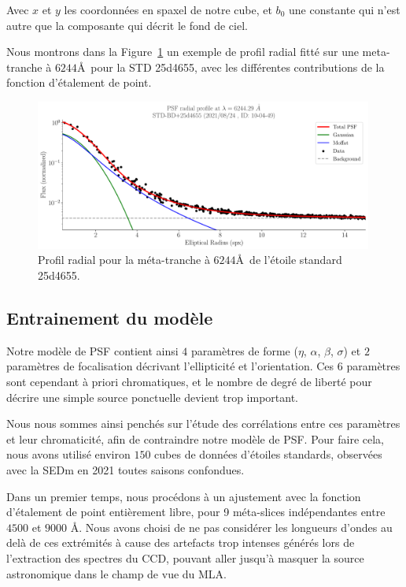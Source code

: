 \documentclass[../main/main.tex]{subfiles}
\begin{document}
Avec $x$ et $y$ les coordonnées en spaxel de notre cube, et $b_{0}$ une
constante qui n'est autre que la composante qui décrit le fond de ciel.

Nous montrons dans la Figure~\ref{fig:radialprofile} un exemple de
profil radial fitté sur une meta-tranche à $6244$\AA\ pour la STD
25d4655, avec les différentes contributions de la fonction
d'étalement de point.
\begin{figure}[ht]
  \centering
  \includegraphics[width=0.99\textwidth]{../figures/06_irf/psfprofile.pdf}
  \caption[Exemple de profil radial d'un étoile standard]{Profil radial
    pour la méta-tranche à $6244$\AA\ de l'étoile standard 25d4655.}
  \label{fig:radialprofile}
\end{figure}

\subsection{Entrainement du modèle}\label{ssec:psftraining}

Notre modèle de PSF contient ainsi $4$ paramètres de forme ($\eta$,
$\alpha$, $\beta$, $\sigma$) et $2$ paramètres de focalisation décrivant
l'ellipticité et l'orientation. Ces $6$ paramètres sont cependant à
priori chromatiques, et le nombre de degré de liberté pour décrire une
simple source ponctuelle devient trop important.

Nous nous sommes ainsi penchés sur l'étude des corrélations entre ces
paramètres et leur chromaticité, afin de contraindre notre modèle de
PSF. Pour faire cela, nous avons utilisé environ $150$ cubes de
données d'étoiles standards, observées avec la SEDm en 2021 toutes saisons
confondues. 

Dans un premier temps, nous procédons à un ajustement avec la fonction
d'étalement de point entièrement libre, pour 9 méta-slices indépendantes
entre $4500$ et $9000$ \AA. Nous avons choisi de ne pas considérer les
longueurs d'ondes au delà de ces extrémités à cause des artefacts trop intenses
générés lors de l'extraction des spectres du CCD, pouvant aller jusqu'à
masquer la source astronomique dans le champ de vue du MLA.
\end{document}
